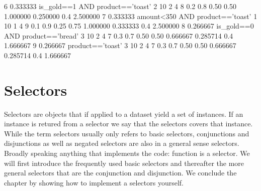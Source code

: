 \documentclass[letterpaper,10pt,english]{sphinxmanual}
\begin{document}
{\begin{sphinxVerbatim}[commandchars=\\\{\}]
6  0.333333         is\_gold==1 AND product=='toast'        2            10             2                  4                8               0.2                       0.8         0.50                 0.50         1.000000                 0.250000                   0.4  2.500000
7  0.333333         amount<350 AND product=='toast'        1            10             1                  4                9               0.1                       0.9         0.25                 0.75         1.000000                 0.333333                   0.4  2.500000
8  0.266667         is\_gold==0 AND product=='bread'        3            10             2                  4                7               0.3                       0.7         0.50                 0.50         0.666667                 0.285714                   0.4  1.666667
9  0.266667                        product=='toast'        3            10             2                  4                7               0.3                       0.7         0.50                 0.50         0.666667                 0.285714                   0.4  1.666667
\end{sphinxVerbatim}
}

{
\begin{sphinxVerbatim}[commandchars=\\\{\}]
\llap{\color{nbsphinxin}[ ]:\,\hspace{\fboxrule}\hspace{\fboxsep}}
\end{sphinxVerbatim}
}


\chapter{Selectors}
\label{\detokenize{Selectors:selectors}}\label{\detokenize{Selectors::doc}}
Selectors are objects that if applied to a dataset yield a set of instances. If an instance is retured from a selector we say that the selectors covers that instance.
While the term selectors usually only refers to basic selectors, conjunctions and disjunctions as well as negated selectors are also in a general sense selectors. Broadly speaking anything that implements the code: function is a selector.
We will first introduce the frequently used basic selectors and thereafter the more general selectors that are the conjunction and disjunction. We conclude the chapter by showing how to implement a selectors yourself.
\end{document}
